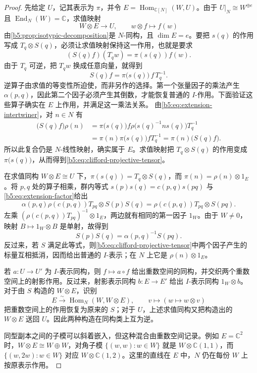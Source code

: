 \begin{proof}
	先给定 \(U\)，记其表示为 \(\pi\)，并令 \(E=\operatorname{Hom}_{\mathbb C[N]}(W,U)\)。由于 \(U|_N\cong W^{\oplus e}\) 且 \(\operatorname{End}_N(W)=\mathbb C\)，求值映射
	\[
		W\otimes E\longrightarrow U,\qquad w\otimes f\longmapsto f(w)
	\]
	由\cref{b5:prop:isotypic-decomposition}是 \(N\)-同构，且 \(\dim E=e\)。要把 \(s(q)\) 的作用写成 \(T_q\otimes S(q)\)，必须让求值映射保持这一作用，也就是要求
	\[
		(S(q)f)(T_qw)=\pi(s(q))f(w).
	\]
	由于 \(T_q\) 可逆，把 \(T_qw\) 换成任意向量，就得到
	\[
		S(q)f=\pi\bigl(s(q)\bigr)\,f\,T_q^{-1}.
	\]
	逆算子由求值的等变性所迫使，而非另作的选择。第一个张量因子的乘法产生 \(\alpha(p,q)\)，因此第二个因子必须产生其倒数，才能恢复普通的 \(I\)-作用。下面验证这些算子确实在 \(E\) 上作用，并满足这一乘法关系。 由\eqref{b5:eq:extension-intertwiner}，对 \(n\in N\) 有
	\[
		\begin{aligned}
			\bigl(S(q)f\bigr)\rho(n) &=\pi\bigl(s(q)\bigr)f \rho\bigl(s(q)^{-1}ns(q)\bigr)T_q^{-1}\\
			&=\pi(n)\pi\bigl(s(q)\bigr)fT_q^{-1} =\pi(n)\bigl(S(q)f\bigr).
		\end{aligned}
	\]
	所以此复合仍是 \(N\)-线性映射，确实属于 \(E\)。求值映射把 \(T_q\otimes S(q)\) 的作用变成 \(\pi\bigl(s(q)\bigr)\)，从而得到\eqref{b5:eq:clifford-projective-tensor}。

	在求值同构 \(W\otimes E\cong U\) 下，\(\pi(s(q))=T_q\otimes S(q)\)，而 \(\pi(n)=\rho(n)\otimes1_E\)。将 \(p,q\) 处的算子相乘，群内等式 \(s(p)s(q)=c(p,q)s(pq)\) 与\eqref{b5:eq:extension-factor}给出
	\[
		\alpha(p,q)\rho(c(p,q))T_{pq}\otimes S(p)S(q) =\rho(c(p,q))T_{pq}\otimes S(pq).
	\]
	左乘 \((\rho(c(p,q))T_{pq})^{-1}\otimes1_E\)，两边就有相同的第一因子 \(1_W\)。由于 \(W\ne0\)，映射 \(B\mapsto1_W\otimes B\) 是单射，故得到
	\[
		S(p)S(q)=\alpha(p,q)^{-1}S(pq).
	\]
	反过来，若 \(S\) 满足此等式，则\eqref{b5:eq:clifford-projective-tensor}中两个因子产生的标量互相抵消，因而给出普通的 \(I\)-表示；在 \(N\) 上它是 \(\rho(n)\otimes1_E\)。

	若 \(a:U\to U'\) 为 \(I\)-表示同构，则 \(f\mapsto a\circ f\) 给出重数空间的同构，并交织两个重数空间上的射影作用。反过来，射影表示同构 \(b:E\to E'\) 给出 \(I\)-表示同构 \(1_W\otimes b\)。对于由 \(S\) 构造的 \(W\otimes E\)，识别
	\[
		E\xrightarrow{\sim}\operatorname{Hom}_N(W,W\otimes E), \qquad v\longmapsto(w\longmapsto w\otimes v)
	\]
	把重数空间上的作用恢复为原来的 \(S\)；对于 \(U\)，上述求值同构又把构造出的 \(W\otimes E\) 送回 \(U\)。因此两种构造在同构类上互为逆。

	同型副本之间的子模可以斜着嵌入，但这种混合由重数空间记录。例如 \(E=\mathbb C^2\) 时，\(W\otimes E\cong W\oplus W\)，对角子模 \(\{(w,w):w\in W\}\) 就是 \(W\otimes\mathbb C(1,1)\)，而 \(\{(w,2w):w\in W\}\) 对应 \(W\otimes\mathbb C(1,2)\)。这里的直线在 \(E\) 中，\(N\) 仍在每份 \(W\) 上按原表示作用。


\end{proof}
